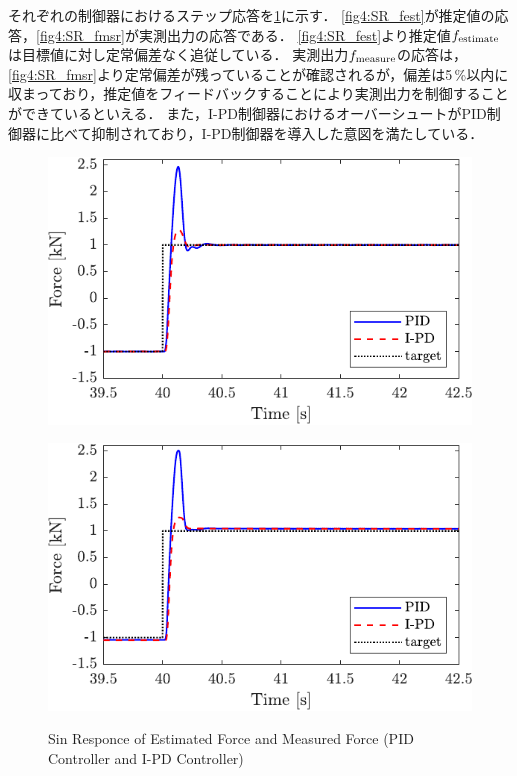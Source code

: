 それぞれの制御器におけるステップ応答を\figname\ref{fig4:SRofPIDandIPD}に示す．
\figname\ref{fig4:SR_fest}が推定値の応答，\figname\ref{fig4:SR_fmsr}が実測出力の応答である．
\figname\ref{fig4:SR_fest}より推定値$f_\mathrm{estimate}$は目標値に対し定常偏差なく追従している．
実測出力$f_\mathrm{measure}$の応答は，\figname\ref{fig4:SR_fmsr}より定常偏差が残っていることが確認されるが，偏差は5\,\%以内に収まっており，推定値をフィードバックすることにより実測出力を制御することができているといえる．
また，I-PD制御器におけるオーバーシュートがPID制御器に比べて抑制されており，I-PD制御器を導入した意図を満たしている．

\begin{figure}[tbp]
    \begin{minipage}{\minipageratio\hsize}
        \centering
        \includegraphics[keepaspectratio, scale = \minifigscale]{contents/ForceControl/figure/1115_PIDandI-PDestforce_step.pdf}
        \label{fig4:SR_fest}
    \end{minipage}
    \begin{minipage}{\minipageratio\hsize}
        \centering
        \includegraphics[keepaspectratio, scale = \minifigscale]{contents/ForceControl/figure/1115_PIDandI-PDforce_step.pdf}
        \label{fig4:SR_fmsr}
    \end{minipage}
    \caption{Sin Responce of Estimated Force and Measured Force (PID Controller and I-PD Controller)}
    \label{fig4:SRofPIDandIPD}
\end{figure}


